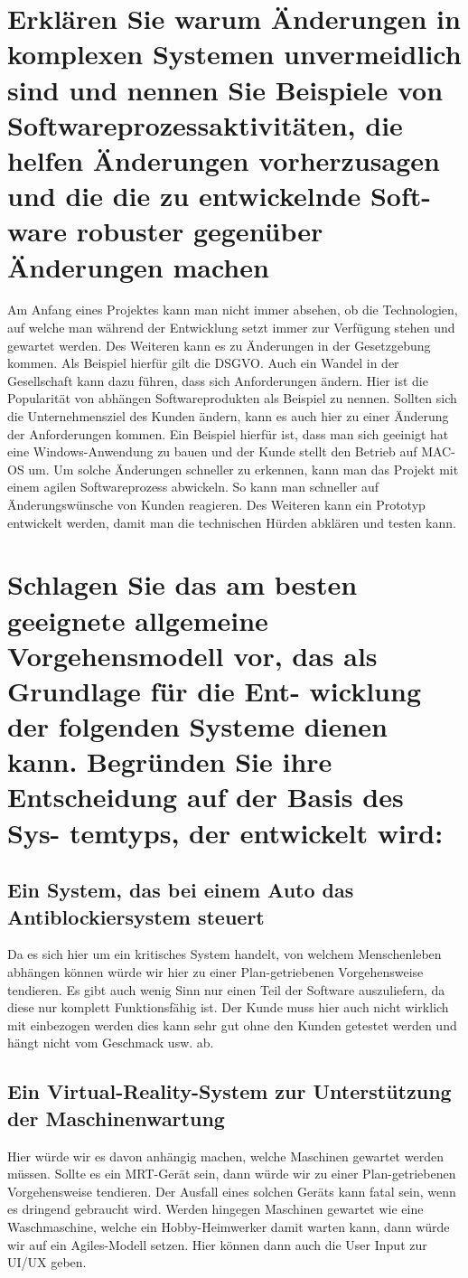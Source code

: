 \documentclass[12pt]{article}
\begin{document}
\section{Erklären Sie warum Änderungen in komplexen Systemen unvermeidlich sind und nennen Sie Beispiele
von Softwareprozessaktivitäten, die helfen Änderungen vorherzusagen und die die zu entwickelnde Soft-
ware robuster gegenüber Änderungen machen}
Am Anfang eines Projektes kann man nicht immer absehen, ob die Technologien, auf welche man während der Entwicklung setzt immer zur Verfügung stehen und gewartet werden. Des Weiteren kann es zu Änderungen in der Gesetzgebung kommen. Als Beispiel hierfür gilt die DSGVO. Auch ein Wandel in der Gesellschaft kann dazu führen, dass sich Anforderungen ändern. Hier ist die Popularität von abhängen Softwareprodukten als Beispiel zu nennen. Sollten sich die Unternehmensziel des Kunden ändern, kann es auch hier zu einer Änderung der Anforderungen kommen. Ein Beispiel hierfür ist, dass man sich geeinigt hat eine Windows-Anwendung zu bauen und der Kunde stellt den Betrieb auf MAC-OS um.
Um solche Änderungen schneller zu erkennen, kann man das Projekt mit einem agilen Softwareprozess abwickeln. So kann man schneller auf Änderungswünsche von Kunden reagieren. Des Weiteren kann ein Prototyp entwickelt werden, damit man die technischen Hürden abklären und testen kann.
\section{Schlagen Sie das am besten geeignete allgemeine Vorgehensmodell vor, das als Grundlage für die Ent-
wicklung der folgenden Systeme dienen kann. Begründen Sie ihre Entscheidung auf der Basis des Sys-
temtyps, der entwickelt wird:}
\subsection{Ein System, das bei einem Auto das Antiblockiersystem steuert}
Da es sich hier um ein kritisches System handelt, von welchem Menschenleben abhängen können würde wir hier zu einer Plan-getriebenen Vorgehensweise tendieren.
Es gibt auch wenig Sinn nur einen Teil der Software auszuliefern, da diese nur komplett Funktionsfähig ist. Der Kunde muss hier auch nicht wirklich mit einbezogen werden dies kann sehr gut ohne den Kunden getestet werden und hängt nicht vom Geschmack usw. ab.
\subsection{Ein Virtual-Reality-System zur Unterstützung der Maschinenwartung}
Hier würde wir es davon anhängig machen, welche Maschinen gewartet werden müssen. Sollte es ein MRT-Gerät sein, dann würde wir zu einer Plan-getriebenen Vorgehensweise tendieren.
Der Ausfall eines solchen Geräts kann fatal sein, wenn es dringend gebraucht wird. Werden hingegen Maschinen gewartet wie eine Waschmaschine, welche ein Hobby-Heimwerker damit warten kann, dann würde wir auf ein Agiles-Modell setzen. Hier können dann auch die User Input zur UI/UX geben.
\end{document}
